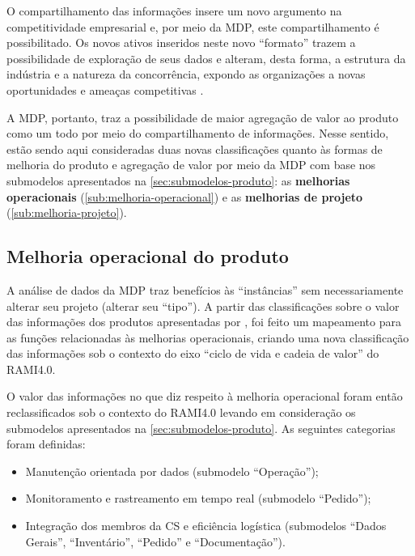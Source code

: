 O compartilhamento das informações insere um novo argumento na competitividade empresarial \cite{framling2013plm} e, por meio da MDP, este compartilhamento é possibilitado. Os novos ativos inseridos neste novo ``formato'' trazem a possibilidade de exploração de seus dados e alteram, desta forma, a estrutura da indústria e a natureza da concorrência, expondo as organizações a novas oportunidades e ameaças competitivas \cite{porter2015smartproducts}.

A MDP, portanto, traz a possibilidade de maior agregação de valor ao produto como um todo por meio do compartilhamento de informações. Nesse sentido, estão sendo aqui consideradas duas novas classificações quanto às formas de melhoria do produto e agregação de valor por meio da MDP com base nos submodelos apresentados na \autoref{sec:submodelos-produto}: as \textbf{melhorias operacionais} (\autoref{sub:melhoria-operacional}) e as \textbf{melhorias de projeto} (\autoref{sub:melhoria-projeto}).

\subsection{Melhoria operacional do produto}
\label{sub:melhoria-operacional}

A análise de dados da MDP traz benefícios às ``instâncias'' sem necessariamente alterar seu projeto (alterar seu ``tipo''). A partir das classificações sobre o valor das informações dos produtos apresentadas por , foi feito um mapeamento para as funções relacionadas às melhorias operacionais, criando uma nova classificação das informações sob o contexto do eixo ``ciclo de vida e cadeia de valor'' do RAMI4.0.

O valor das informações no que diz respeito à melhoria operacional foram então reclassificados sob o contexto do RAMI4.0 levando em consideração os submodelos apresentados na \autoref{sec:submodelos-produto}. As seguintes categorias foram definidas:

\begin{itemize}
	\item Manutenção orientada por dados (submodelo ``Operação'');
	\item Monitoramento e rastreamento em tempo real (submodelo ``Pedido'');
	\item Integração dos membros da CS e eficiência logística (submodelos ``Dados Gerais'', ``Inventário'', ``Pedido'' e ``Documentação'').
\end{itemize}

